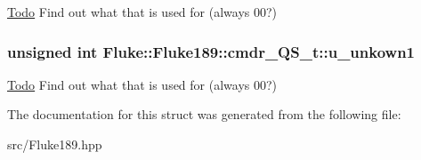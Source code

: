 \label{structFluke_1_1Fluke189_1_1cmdr__QS__t_a5df8b378d557e36494d127471e465612}
\begin{Desc}
\item[\hyperlink{todo__todo000006}{Todo}]Find out what that is used for (always 00?) \end{Desc}
\hypertarget{structFluke_1_1Fluke189_1_1cmdr__QS__t_a5a7897b4c26236a65ffc6d008b19ce67}{
\subsubsection[{u\_\-unkown1}]{\setlength{\rightskip}{0pt plus 5cm}unsigned int {\bf Fluke::Fluke189::cmdr\_\-QS\_\-t::u\_\-unkown1}}}
\label{structFluke_1_1Fluke189_1_1cmdr__QS__t_a5a7897b4c26236a65ffc6d008b19ce67}
\begin{Desc}
\item[\hyperlink{todo__todo000004}{Todo}]Find out what that is used for (always 00?) \end{Desc}


The documentation for this struct was generated from the following file:\begin{DoxyCompactItemize}
\item 
src/Fluke189.hpp\end{DoxyCompactItemize}
